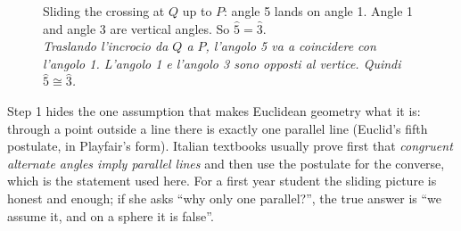 \documentclass[10pt,a4paper,oneside]{book}
\newcommand{\bicap}[2]{\caption{#1\\{\color{itgreen}\itshape #2}}}
\newcommand{\av}[1]{\widehat{#1}}           %
\begin{document}
\begin{figure}[htbp]
\centering
\bicap{Sliding the crossing at $Q$ up to $P$: angle 5 lands on angle 1. Angle 1 and angle 3 are vertical angles. So $\av{5} = \av{3}$.}%
      {Traslando l'incrocio da $Q$ a $P$, l'angolo 5 va a coincidere con l'angolo 1. L'angolo 1 e l'angolo 3 sono opposti al vertice. Quindi $\av{5} \cong \av{3}$.}
\label{fig:slide}
\end{figure}

\begin{tutor}
Step 1 hides the one assumption that makes Euclidean geometry what it is: through a point outside a line there is exactly one parallel line (Euclid's fifth postulate, in Playfair's form). Italian textbooks usually prove first that \emph{congruent alternate angles imply parallel lines} and then use the postulate for the converse, which is the statement used here. For a first year student the sliding picture is honest and enough; if she asks ``why only one parallel?'', the true answer is ``we assume it, and on a sphere it is false''.
\end{tutor}
\end{document}
